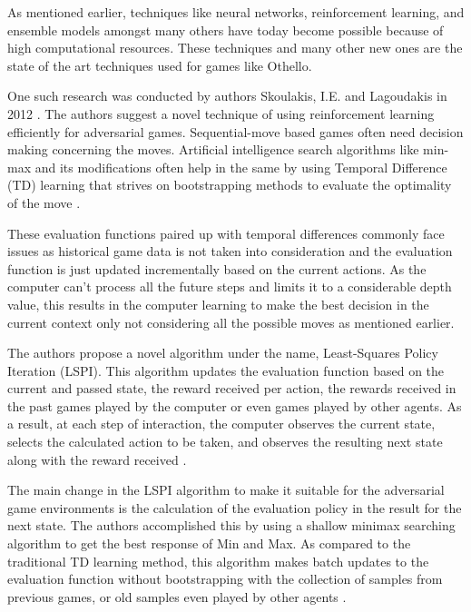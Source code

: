 \documentclass{svproc}
\begin{document}
As mentioned earlier, techniques like neural networks, reinforcement learning, and ensemble models amongst many others have today become possible because of high computational resources. These techniques and many other new ones are the state of the art techniques used for games like Othello.

One such research was conducted by authors Skoulakis, I.E. and Lagoudakis in 2012 \cite{esmond_1}. The authors suggest a novel technique of using reinforcement learning efficiently for adversarial games. Sequential-move based games often need decision making concerning the moves. Artificial intelligence search algorithms like min-max and its modifications often help in the same by using Temporal Difference (TD) learning that strives on bootstrapping methods to evaluate the optimality of the move \cite{esmond_1}.

These evaluation functions paired up with temporal differences commonly face issues as historical game data is not taken into consideration and the evaluation function is just updated incrementally based on the current actions. As the computer can't process all the future steps and limits it to a considerable depth value, this results in the computer learning to make the best decision in the current context only not considering all the possible moves as mentioned earlier.

The authors propose a novel algorithm under the name, Least-Squares Policy Iteration (LSPI). This algorithm updates the evaluation function based on the current and passed state, the reward received per action, the rewards received in the past games played by the computer or even games played by other agents. As a result, at each step of interaction, the computer observes the current state, selects the calculated action to be taken, and observes the resulting next state along with the reward received \cite{esmond_1}.

The main change in the LSPI algorithm to make it suitable for the adversarial game environments is the calculation of the evaluation policy in the result for the next state. The authors accomplished this by using a shallow minimax searching algorithm to get the best response of Min and Max. As compared to the traditional TD learning method, this algorithm makes batch updates to the evaluation function without bootstrapping with the collection of samples from previous games, or old samples even played by other agents \cite{esmond_1}.
\end{document}
